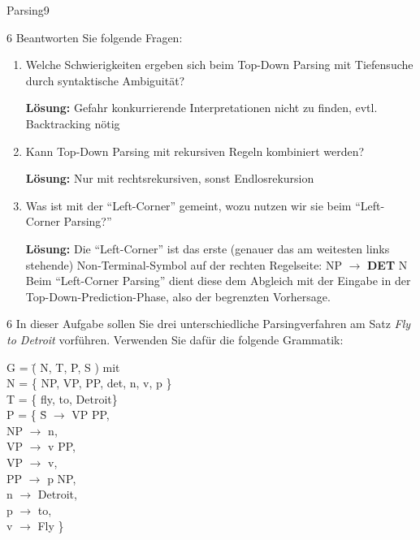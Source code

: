 \documentclass{julie-exercises}
\begin{document}
\begin{aufgabe}{Parsing}{9}
	\begin{teilaufgabe}{}{6}
		Beantworten Sie folgende Fragen:
		\begin{enumerate}
			\item Welche Schwierigkeiten ergeben sich beim Top-Down Parsing mit Tiefensuche durch syntaktische Ambiguität?
				\begin{loesung}

				\textbf{L\"osung:}
				Gefahr konkurrierende Interpretationen nicht zu finden, evtl. Backtracking n\"otig
				\end{loesung}

			\item Kann Top-Down Parsing mit rekursiven Regeln kombiniert werden?
				\begin{loesung}

				\textbf{L\"osung:}
				Nur mit rechtsrekursiven, sonst Endlosrekursion
				\end{loesung}

			\item Was ist mit der ``Left-Corner'' gemeint, wozu nutzen wir sie beim ``Left-Corner Parsing?''
				\begin{loesung}

				\textbf{L\"osung:}
				Die ``Left-Corner'' ist das erste (genauer das am weitesten links stehende) Non-Terminal-Symbol auf der rechten Regelseite: NP $\rightarrow$ \textbf{DET} N\\
				Beim ``Left-Corner Parsing'' dient diese dem Abgleich mit der Eingabe in der Top-Down-Prediction-Phase, also der begrenzten Vorhersage.
				\end{loesung}
		\end{enumerate}
	\end{teilaufgabe}


	\begin{teilaufgabe}{}{6}
		In dieser Aufgabe sollen Sie drei unterschiedliche Parsingverfahren am Satz \textit{Fly to Detroit} vorführen. Verwenden Sie dafür die folgende Grammatik:\\
		\begin{tabbing}
		G = \=( N, T, P, S ) mit \\
		N = \> \{ NP, VP, PP, det, n, v, p \} \\
		T = \> \{ fly, to, Detroit\} \\
		P = \> \{	\= S $\rightarrow$ VP PP, \\
			\>		\> NP $\rightarrow$ n, \\
			\>		\> VP $\rightarrow$ v PP, \\
			\>		\> VP $\rightarrow$ v, \\
			\>		\> PP $\rightarrow$ p NP, \\
			\>		\> n $\rightarrow$ Detroit, \\
			\>		\> p $\rightarrow$ to, \\
			\>		\> v $\rightarrow$ Fly \}\\
		\end{tabbing}


\end{teilaufgabe}
\end{aufgabe}
\end{document}
